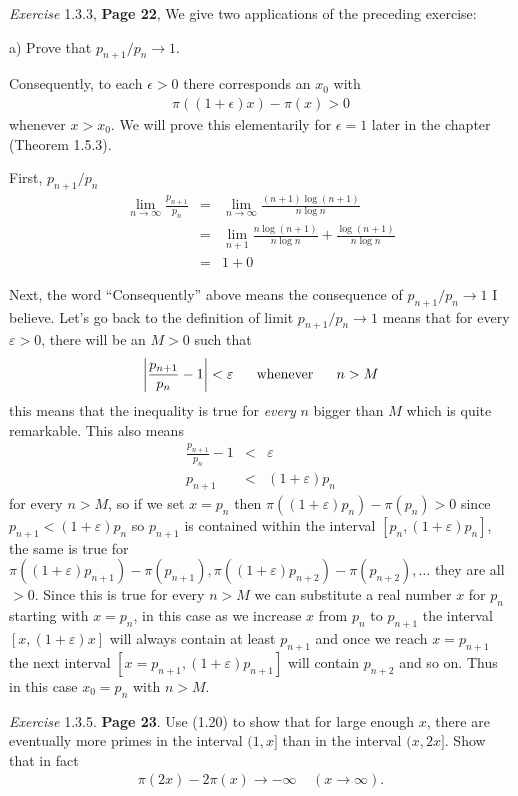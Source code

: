 \documentclass[aps,preprint,preprintnumbers,nofootinbib,showpacs,prd]{revtex4-1}
\newcommand{\nbea}{\begin{eqnarray*}}
\newcommand{\neea}{\end{eqnarray*}}
\begin{document}
{\it Exercise} 1.3.3, {\bf Page 22}, We give two applications of the preceding exercise:

a) Prove that $p_{n+1} /p_n \to 1$.

Consequently, to each $\epsilon > 0$ there corresponds an $x_0$ with 
%
\nbea
\pi((1 + \epsilon)x) − \pi(x) > 0
\neea
%
whenever $x > x_0$. We will prove this elementarily for $\epsilon = 1$ later in the chapter (Theorem 1.5.3).

First, $p_{n+1}/p_n$
%
\nbea
\lim_{n\to\infty} \frac{p_{n+1}}{p_n} & = & \lim_{n\to\infty} \frac{(n+1)\log(n+1)}{n\log n} \\
& = & \lim_{n+1} \frac{n\log(n+1)}{n\log n} + \frac{\log(n+1)}{n\log n} \\
& = & 1 + 0
\neea
%

Next, the word ``Consequently'' above means the consequence of $p_{n+1}/p_n \to 1$ I believe. Let's go back to the definition of limit $p_{n+1}/p_n \to 1$ means that for every $\varepsilon > 0$, there will be an $M > 0$ such that
%
\nbea
\left|\frac{p_{n+1}}{p_n} - 1\right| < \varepsilon ~~~~~ {\rm whenever} ~~~~~ n > M
\neea
%
this means that the inequality is true for {\it every} $n$ bigger than $M$ which is quite remarkable. This also means
%
\nbea
\frac{p_{n+1}}{p_n} - 1 & < & \varepsilon \\
p_{n+1} & < & (1 + \varepsilon)p_n
\neea
%
for every $n > M$, so if we set $x = p_n$ then $\pi((1+\varepsilon)p_n) - \pi(p_n) > 0$ since $p_{n+1} < (1 + \varepsilon)p_n$ so $p_{n+1}$ is contained within the interval $[p_n,(1+\varepsilon)p_n]$, the same is true for $\pi((1+\varepsilon)p_{n+1}) - \pi(p_{n+1}), \pi((1+\varepsilon)p_{n+2}) - \pi(p_{n+2}), \dots$ they are all $> 0$. Since this is true for every $n > M$ we can substitute a real number $x$ for $p_n$ starting with $x = p_n$, in this case as we increase $x$ from $p_n$ to $p_{n+1}$ the interval $[x,(1+\varepsilon)x]$ will always contain at least $p_{n+1}$ and once we reach $x=p_{n+1}$ the next interval $[x=p_{n+1}, (1+\varepsilon)p_{n+1}]$ will contain $p_{n+2}$ and so on. Thus in this case $x_0 = p_n$ with $n > M$.

{\it Exercise} 1.3.5. {\bf Page 23}. Use (1.20) to show that for large enough $x$, there are eventually more primes in the interval $(1, x]$ than in the interval $(x, 2x]$. Show that in fact
%
\nbea
\pi(2x) - 2\pi(x) \to -\infty ~~~~~ (x \to \infty ).
\neea
%
\end{document}
